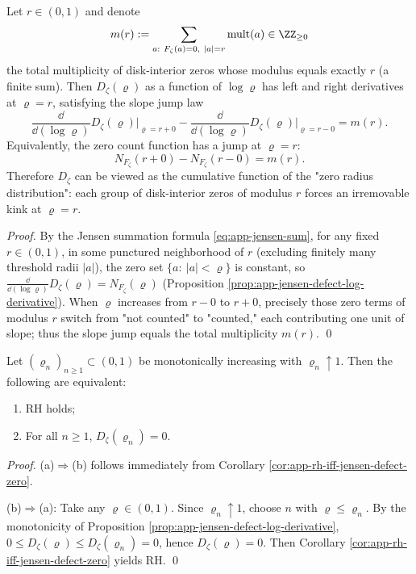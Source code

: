 \begin{corollary}\label{cor:app-jensen-defect-kink-structure}
Let \(r\in(0,1)\) and denote
\[
m(r):=\sum_{a:\ F_{\zeta}(a)=0,\ |a|=r}\mathrm{mult}(a)\in\ZZ_{\ge 0}
\]
the total multiplicity of disk-interior zeros whose modulus equals exactly \(r\) (a finite sum).
Then \(D_{\zeta}(\varrho)\) as a function of \(\log\varrho\) has left and right derivatives at \(\varrho=r\), satisfying the slope jump law
\[
\frac{\dd}{\dd(\log\varrho)}D_{\zeta}(\varrho)\Big|_{\varrho=r+0}
-\frac{\dd}{\dd(\log\varrho)}D_{\zeta}(\varrho)\Big|_{\varrho=r-0}
=m(r).
\]
Equivalently, the zero count function has a jump at \(\varrho=r\):
\[
N_{F_{\zeta}}(r+0)-N_{F_{\zeta}}(r-0)=m(r).
\]
Therefore \(D_{\zeta}\) can be viewed as the cumulative function of the "zero radius distribution": each group of disk-interior zeros of modulus \(r\) forces an irremovable kink at \(\varrho=r\).
\end{corollary}
\begin{proof}
By the Jensen summation formula \eqref{eq:app-jensen-sum}, for any fixed \(r\in(0,1)\), in some punctured neighborhood of \(r\) (excluding finitely many threshold radii \(|a|\)),
the zero set \(\{a:\ |a|<\varrho\}\) is constant, so
\(
\frac{\dd}{\dd(\log\varrho)}D_{\zeta}(\varrho)=N_{F_{\zeta}}(\varrho)
\)
(Proposition \ref{prop:app-jensen-defect-log-derivative}).
When \(\varrho\) increases from \(r-0\) to \(r+0\), precisely those zero terms of modulus \(r\) switch from "not counted" to "counted," each contributing one unit of slope; thus the slope jump equals the total multiplicity \(m(r)\).
\qed
\end{proof}

\begin{theorem}\label{thm:app-jensen-countable-criterion}
Let \((\varrho_n)_{n\ge 1}\subset(0,1)\) be monotonically increasing with \(\varrho_n\uparrow 1\).
Then the following are equivalent:
\begin{enumerate}
  \item[(a)] RH holds;
  \item[(b)] For all \(n\ge 1\), \(D_{\zeta}(\varrho_n)=0\).
\end{enumerate}
\end{theorem}
\begin{proof}
(a)\(\Rightarrow\)(b) follows immediately from Corollary \ref{cor:app-rh-iff-jensen-defect-zero}.
\par
(b)\(\Rightarrow\)(a): Take any \(\varrho\in(0,1)\).
Since \(\varrho_n\uparrow 1\), choose \(n\) with \(\varrho\le \varrho_n\).
By the monotonicity of Proposition \ref{prop:app-jensen-defect-log-derivative}, \(0\le D_{\zeta}(\varrho)\le D_{\zeta}(\varrho_n)=0\), hence \(D_{\zeta}(\varrho)=0\).
Then Corollary \ref{cor:app-rh-iff-jensen-defect-zero} yields RH. \qed
\end{proof}

